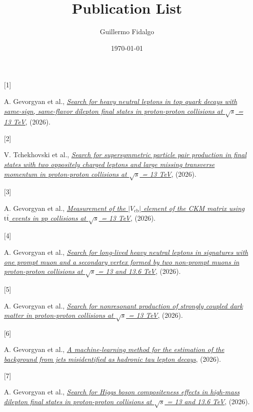 \documentclass[
]{article}
\title{Publication List}
\author{Guillermo Fidalgo}
\date{\today}
\newlength{\cslhangindent}
\newlength{\csllabelwidth}
\newenvironment{CSLReferences}[2] %
 {\begin{list}{}{%
  \setlength{\itemindent}{0pt}
  \setlength{\leftmargin}{0pt}
  \setlength{\parsep}{0pt}
  \ifodd #1
   \setlength{\leftmargin}{\cslhangindent}
   \setlength{\itemindent}{-1\cslhangindent}
  \fi
  \setlength{\itemsep}{#2\baselineskip}}}
 {\end{list}}
\newcommand{\CSLLeftMargin}[1]{\parbox[t]{\csllabelwidth}{\strut#1\strut}}
\newcommand{\CSLRightInline}[1]{\parbox[t]{\linewidth - \csllabelwidth}{\strut#1\strut}}
\begin{document}
\maketitle

\label{refs}
\begin{CSLReferences}{0}{0}
\CSLLeftMargin{{[}1{]} }%
\CSLRightInline{A. Gevorgyan et al.,
\emph{\href{https://arxiv.org/abs/2611.04904}{{Search for heavy neutral
leptons in top quark decays with same-sign, same-flavor dilepton final
states in proton-proton collisions at \(\sqrt{s}\) = 13 TeV}}}, (2026).}

\CSLLeftMargin{{[}2{]} }%
\CSLRightInline{V. Tchekhovski et al.,
\emph{\href{https://arxiv.org/abs/2611.02183}{{Search for supersymmetric
particle pair production in final states with two oppositely charged
leptons and large missing transverse momentum in proton-proton
collisions at \(\sqrt{s}\) = 13 TeV}}}, (2026).}

\CSLLeftMargin{{[}3{]} }%
\CSLRightInline{A. Gevorgyan et al.,
\emph{\href{https://arxiv.org/abs/2611.01274}{{Measurement of the
\(\lvert V_\mathrm{cb}\rvert\) element of the CKM matrix using
\(\mathrm{t\bar{t}}\) events in pp collisions at \(\sqrt{s}\) = 13
TeV}}}, (2026).}

\CSLLeftMargin{{[}4{]} }%
\CSLRightInline{A. Gevorgyan et al.,
\emph{\href{https://arxiv.org/abs/2610.40911}{{Search for long-lived
heavy neutral leptons in signatures with one prompt muon and a secondary
vertex formed by two non-prompt muons in proton-proton collisions at
\(\sqrt{s}\) = 13 and 13.6 TeV}}}, (2026).}

\CSLLeftMargin{{[}5{]} }%
\CSLRightInline{A. Gevorgyan et al.,
\emph{\href{https://arxiv.org/abs/2610.33140}{{Search for nonresonant
production of strongly coupled dark matter in proton-proton collisions
at \(\sqrt{s}\) = 13 TeV}}}, (2026).}

\CSLLeftMargin{{[}6{]} }%
\CSLRightInline{A. Gevorgyan et al.,
\emph{\href{https://arxiv.org/abs/2610.13634}{{A machine-learning method
for the estimation of the background from jets misidentified as hadronic
tau lepton decays}}}, (2026).}

\CSLLeftMargin{{[}7{]} }%
\CSLRightInline{A. Gevorgyan et al.,
\emph{\href{https://arxiv.org/abs/2610.04782}{{Search for Higgs boson
compositeness effects in high-mass dilepton final states in
proton-proton collisions at \(\sqrt{s}\) = 13 and 13.6 TeV}}}, (2026).}


\end{CSLReferences}
\end{document}
